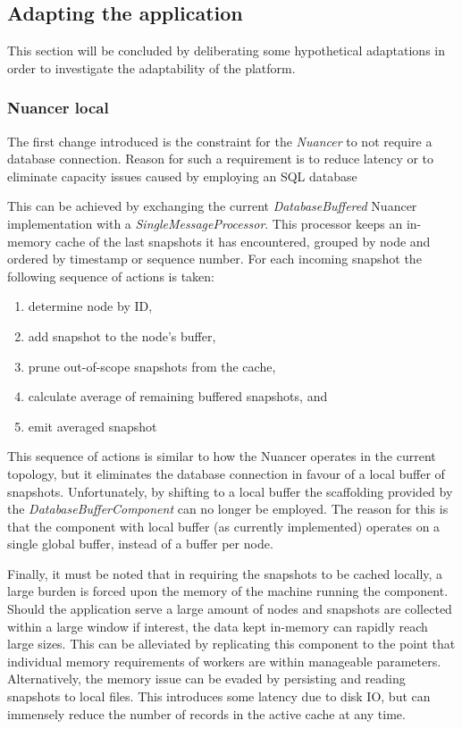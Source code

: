 \subsection{Adapting the application}
This section will be concluded by deliberating some hypothetical adaptations in order to investigate the adaptability of the platform.

\subsubsection{Nuancer local}
The first change introduced is the constraint for the \emph{Nuancer} to not require a database connection. Reason for such a requirement is to reduce latency or to eliminate capacity issues caused by employing an SQL database

This can be achieved by exchanging the current \emph{DatabaseBuffered} Nuancer implementation with a \emph{SingleMessageProcessor}. This processor keeps an in-memory cache of the last snapshots it has encountered, grouped by node and ordered by timestamp or sequence number. For each incoming snapshot the following sequence of actions is taken:
\begin{enumerate}
\nospace
\item determine node by ID,
\item add snapshot to the node's buffer,
\item prune out-of-scope snapshots from the cache,
\item calculate average of remaining buffered snapshots, and
\item emit averaged snapshot
\end{enumerate}
This sequence of actions is similar to how the Nuancer operates in the current topology, but it eliminates the database connection in favour of a local buffer of snapshots. Unfortunately, by shifting to a local buffer the scaffolding provided by the \emph{DatabaseBufferComponent} can no longer be employed. The reason for this is that the component with local buffer (as currently implemented) operates on a single global buffer, instead of a buffer per node.

Finally, it must be noted that in requiring the snapshots to be cached locally, a large burden is forced upon the memory of the machine running the component. Should the application serve a large amount of nodes and snapshots are collected within a large window if interest, the data kept in-memory can rapidly reach large sizes. This can be alleviated by replicating this component to the point that individual memory requirements of workers are within manageable parameters. Alternatively, the memory issue can be evaded by persisting and reading snapshots to local files. This introduces some latency due to disk IO, but can immensely reduce the number of records in the active cache at any time.

